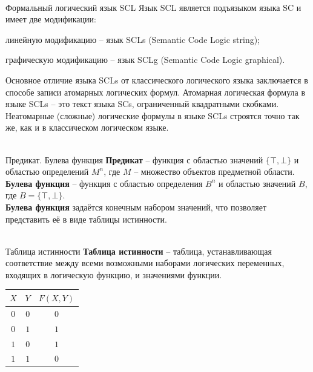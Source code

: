 \begin{frame}{\\Формальный логический язык SCL}
	\topline
	\justifying
	Язык SCL является подъязыком языка SC и имеет две модификации:
	\begin{textitemize}
		\item{линейную модификацию – язык SCLs (Semantic Code Logic string);}
		\item{графическую модификацию – язык SCLg (Semantic Code Logic graphical). }
	\end{textitemize}
	Основное отличие языка SCLs от классического логического языка заключается в способе записи атомарных логических формул. Атомарная логическая формула в языке SCLs – это текст языка SCs, ограниченный квадратными скобками. Неатомарные (сложные) логические формулы в языке SCLs строятся точно так же, как и в классическом логическом языке.
\end{frame}

\begin{frame}{\\Предикат. Булева функция}
	\topline
	\justifying
	\textbf{Предикат} -- функция с областью значений $\{\top, \bot\}$ и областью определений $M^n$, где $M$ -- множество объектов предметной области.\\
	\textbf{Булева функция} -- функция с областью определения $B^n$ и областью значений $B$, где $B = \{\top, \bot\}$.\\
	\textbf{Булева функция} задаётся конечным набором значений, что позволяет представить её в виде таблицы истинности.
\end{frame}

\begin{frame}{\\Таблица истинности}
	\topline
	\justifying
	\textbf{Таблица истинности} -- таблица, устанавливающая соответствие между всеми возможными наборами логических переменных, входящих в логическую функцию, и значениями функции.\\
	\vspace{5mm}
	\begin{center}
		\begin{tabular}{|c|c|c|}
			\hline
			$X$ & $Y$ & $F(X,Y)$\\
			\hline
			$0$ & $0$ & $0$\\
			\hline
			$0$ & $1$ & $1$\\
			\hline
			$1$ & $0$ & $1$\\
			\hline
			$1$ & $1$ & $0$\\
			\hline
		\end{tabular}
	\end{center}
\end{frame}


